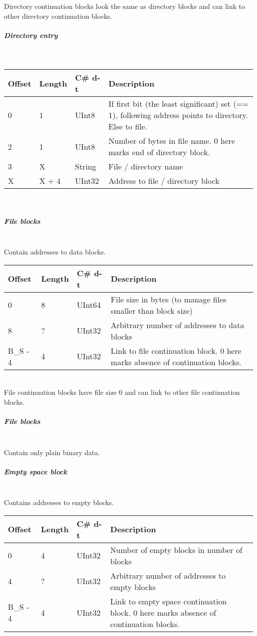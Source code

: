 \documentclass[a4paper,12pt]{article}
\begin{document}
Directory continuation blocks look the same as directory blocks and can link to other directory continuation blocks.

\subparagraph{Directory entry} \mbox{} \\

\begin{tabular}{|p{1.5cm}|p{1.5cm}|p{1.5cm}|p{7cm}|}\hline
Offset 	&Length	&C\# d-t	&Description\\\hline
0	&1	&UInt8	&If first bit (the least significant) set (== 1), following address points to directory. Else to file.\\
2	&1	&UInt8	&Number of bytes in file name. 0 here marks end of directory block.\\
3	&X	&String	&File / directory name\\
X	&X + 4	&UInt32	&Address to file / directory block\\\hline
\end{tabular} \\

\subparagraph{File blocks} \mbox{} \\

Contain addresses to data blocks.\\

\begin{tabular}{|p{1.5cm}|p{1.5cm}|p{1.5cm}|p{7cm}|}\hline
Offset 	&Length	&C\# d-t	&Description\\\hline
0	&8	&UInt64	&File size in bytes (to manage files smaller than block size)\\
8	&?	&UInt32	&Arbitrary number of addresses to data blocks\\
B\_S - 4	&4	&UInt32	&Link to file continuation block. 0 here marks absence of continuation blocks.\\\hline
\end{tabular} \\

File continuation blocks have file size 0 and can link to other file continuation blocks.

\subparagraph{File blocks} \mbox{} \\

Contain only plain binary data.

\subparagraph{Empty space block} \mbox{} \\

Contains addresses to empty blocks.\\

\begin{tabular}{|p{1.5cm}|p{1.5cm}|p{1.5cm}|p{7cm}|}\hline
Offset 	&Length	&C\# d-t	&Description\\\hline
0	&4	&UInt32	&Number of empty blocks in number of blocks\\
4	&?	&UInt32	&Arbitrary number of addresses to empty blocks\\
B\_S - 4	&4	&UInt32	&Link to empty space continuation block. 0 here marks absence of continuation blocks.\\\hline
\end{tabular} \\
\end{document}
